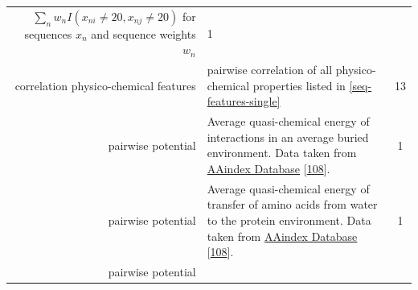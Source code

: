 \documentclass[12pt,a4paper,twoside]{book}
\theoremstyle{definition}
\theoremstyle{definition}
\theoremstyle{remark}
\begin{document}
\begin{longtable}[]{@{}rlc@{}}
\begin{minipage}[t]{0.50\columnwidth}
\(\sum_n w_n I(x_{ni} \! \neq \! 20, x_{nj} \! \neq \! 20)\) for
sequences \(x_n\) and sequence weights \(w_n\)\strut
\end{minipage} & \begin{minipage}[t]{0.18\columnwidth}\centering\strut
1\strut
\end{minipage}\tabularnewline
\begin{minipage}[t]{0.23\columnwidth}\raggedleft\strut
correlation physico-chemical features\strut
\end{minipage} & \begin{minipage}[t]{0.50\columnwidth}\raggedright\strut
pairwise correlation of all physico-chemical properties listed in
\ref{seq-features-single}\strut
\end{minipage} & \begin{minipage}[t]{0.18\columnwidth}\centering\strut
13\strut
\end{minipage}\tabularnewline
\begin{minipage}[t]{0.23\columnwidth}\raggedleft\strut
pairwise potential\strut
\end{minipage} & \begin{minipage}[t]{0.50\columnwidth}\raggedright\strut
Average quasi-chemical energy of interactions in an average buried
environment. Data taken from
\href{http://www.genome.jp/dbget-bin/www_bget?aaindex:MIYS990107}{AAindex
Database} {[}\protect\hyperlink{ref-Kawashima2008}{108}{]}.\strut
\end{minipage} & \begin{minipage}[t]{0.18\columnwidth}\centering\strut
1\strut
\end{minipage}\tabularnewline
\begin{minipage}[t]{0.23\columnwidth}\raggedleft\strut
pairwise potential\strut
\end{minipage} & \begin{minipage}[t]{0.50\columnwidth}\raggedright\strut
Average quasi-chemical energy of transfer of amino acids from water to
the protein environment. Data taken from
\href{http://www.genome.jp/dbget-bin/www_bget?aaindex:MIYS990106}{AAindex
Database} {[}\protect\hyperlink{ref-Kawashima2008}{108}{]}.\strut
\end{minipage} & \begin{minipage}[t]{0.18\columnwidth}\centering\strut
1\strut
\end{minipage}\tabularnewline
\begin{minipage}[t]{0.23\columnwidth}\raggedleft\strut
pairwise potential\strut
\end{minipage} & \begin{minipage}[t]{0.50\columnwidth}\raggedright\strut

\end{minipage}
\end{longtable}
\end{document}
